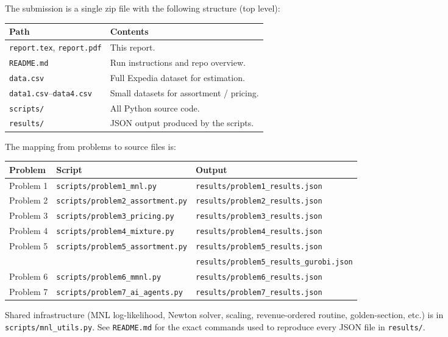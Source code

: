 \documentclass[11pt]{article}
\begin{document}
The submission is a single zip file with the following structure (top level):

\begin{center}
\begin{tabular}{ll}
\toprule
Path & Contents \\
\midrule
\texttt{report.tex}, \texttt{report.pdf} & This report. \\
\texttt{README.md}                       & Run instructions and repo overview. \\
\texttt{data.csv}                        & Full Expedia dataset for estimation. \\
\texttt{data1.csv}--\texttt{data4.csv}   & Small datasets for assortment / pricing. \\
\texttt{scripts/}                        & All Python source code. \\
\texttt{results/}                        & JSON output produced by the scripts. \\
\bottomrule
\end{tabular}
\end{center}

The mapping from problems to source files is:

\begin{center}
\begin{tabular}{lll}
\toprule
Problem & Script & Output \\
\midrule
Problem 1 & \texttt{scripts/problem1\_mnl.py}        & \texttt{results/problem1\_results.json} \\
Problem 2 & \texttt{scripts/problem2\_assortment.py} & \texttt{results/problem2\_results.json} \\
Problem 3 & \texttt{scripts/problem3\_pricing.py}    & \texttt{results/problem3\_results.json} \\
Problem 4 & \texttt{scripts/problem4\_mixture.py}    & \texttt{results/problem4\_results.json} \\
Problem 5 & \texttt{scripts/problem5\_assortment.py} & \texttt{results/problem5\_results.json} \\
          &                                          & \texttt{results/problem5\_results\_gurobi.json} \\
Problem 6 & \texttt{scripts/problem6\_mmnl.py} & \texttt{results/problem6\_results.json} \\
Problem 7 & \texttt{scripts/problem7\_ai\_agents.py} & \texttt{results/problem7\_results.json} \\
\bottomrule
\end{tabular}
\end{center}

Shared infrastructure (MNL log-likelihood, Newton solver, scaling,
revenue-ordered routine, golden-section, etc.) is in
\texttt{scripts/mnl\_utils.py}. See \texttt{README.md} for the exact
commands used to reproduce every JSON file in \texttt{results/}.
\end{document}
